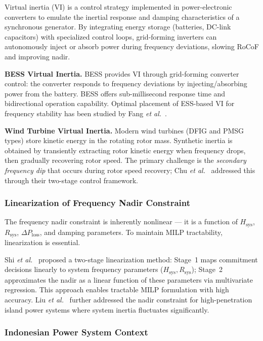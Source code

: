 \documentclass[journal]{IEEEtran}
\begin{document}
Virtual inertia (VI) is a control strategy implemented in
power-electronic converters to emulate the inertial response and
damping characteristics of a synchronous generator. By integrating
energy storage (batteries, DC-link capacitors) with specialized
control loops, grid-forming inverters can autonomously inject or
absorb power during frequency deviations, slowing RoCoF and
improving nadir.

\textbf{BESS Virtual Inertia.} BESS provides VI through
grid-forming converter control: the converter responds to frequency
deviations by injecting/absorbing power from the battery. BESS
offers sub-millisecond response time and bidirectional operation
capability. Optimal placement of ESS-based VI for frequency
stability has been studied by Fang \textit{et al.}~\cite{VI06OptimalPlacement}.

\textbf{Wind Turbine Virtual Inertia.} Modern wind turbines (DFIG
and PMSG types) store kinetic energy in the rotating rotor mass.
Synthetic inertia is obtained by transiently extracting rotor
kinetic energy when frequency drops, then gradually recovering
rotor speed. The primary challenge is the \textit{secondary
frequency dip} that occurs during rotor speed recovery;
Chu \textit{et al.}~\cite{Chu2020} addressed this through their
two-stage control framework.

\subsubsection{Linearization of Frequency Nadir Constraint}

The frequency nadir constraint is inherently nonlinear --- it is a
function of $H_{\text{sys}}$, $R_{\text{sys}}$,
$\Delta P_{\text{loss}}$, and damping parameters. To maintain MILP
tractability, linearization is essential.

Shi \textit{et al.}~\cite{Shi2025} proposed a two-stage
linearization method: Stage~1 maps commitment decisions linearly
to system frequency parameters ($H_{\text{sys}}, R_{\text{sys}}$);
Stage~2 approximates the nadir as a linear function of these
parameters via multivariate regression. This approach enables
tractable MILP formulation with high accuracy.
Liu \textit{et al.}~\cite{Liu2024} further addressed the nadir
constraint for high-penetration island power systems where
system inertia fluctuates significantly.

\subsubsection{Indonesian Power System Context}
\end{document}
